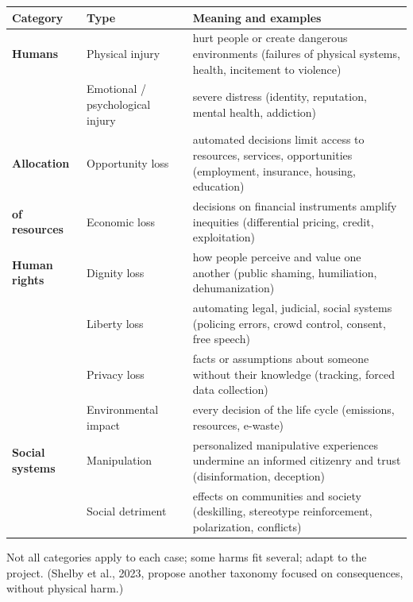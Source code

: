 \documentclass[11pt,a4paper,openany]{book}
\begin{document}
\begin{defnbox}[title={Taxonomy of harms (adapted from Microsoft): \emph{what} is harmed}]
\begin{center}
\begin{tabularx}{\linewidth}{l l X}
\textbf{Category} & \textbf{Type} & \textbf{Meaning and examples} \\ \hline
\textbf{Humans} & Physical injury & hurt people or create dangerous environments (failures of
physical systems, health, incitement to violence) \\
 & Emotional / psychological injury & severe distress (identity, reputation, mental health,
addiction) \\ \hline
\textbf{Allocation} & Opportunity loss & automated decisions limit access to resources, services,
opportunities (employment, insurance, housing, education) \\
\textbf{of resources} & Economic loss & decisions on financial instruments amplify inequities
(differential pricing, credit, exploitation) \\ \hline
\textbf{Human rights} & Dignity loss & how people perceive and value one another (public shaming,
humiliation, dehumanization) \\
 & Liberty loss & automating legal, judicial, social systems (policing errors, crowd control,
consent, free speech) \\
 & Privacy loss & facts or assumptions about someone without their knowledge (tracking, forced
data collection) \\
 & Environmental impact & every decision of the life cycle (emissions, resources, e-waste) \\
\hline
\textbf{Social systems} & Manipulation & personalized manipulative experiences undermine an
informed citizenry and trust (disinformation, deception) \\
 & Social detriment & effects on communities and society (deskilling, stereotype reinforcement,
polarization, conflicts)
\end{tabularx}
\end{center}
Not all categories apply to each case; some harms fit several; adapt to the project. (Shelby
et al., 2023, propose another taxonomy focused on consequences, without physical harm.)
\end{defnbox}
\end{document}
